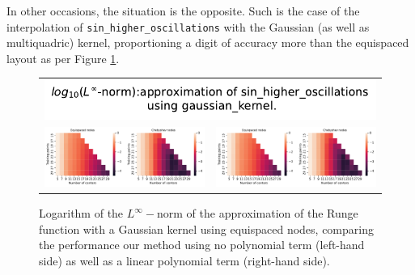 \documentclass[12pt]{report} %
\begin{document}
In other occasions, the situation is the opposite. Such is the case of the interpolation of
\texttt{sin\_higher\_oscillations} with the Gaussian (as well as multiquadric) kernel,
proportioning a digit of accuracy more than the equispaced layout as per
Figure \ref{fig:sin-higher-oscillations-gaussian-kernel-comparison-points-classic}.

\begin{figure}[h]
  \begin{tabular}{cc}
    \multicolumn{2}{c}{{\includegraphics[width=.5\textwidth]
    {imagenes/experiments/1d/variational/linf_sin_higher_oscillations_gaussian_kernel_Points_Classic_Title.pdf}}}                                                                                       \\
    {\includegraphics[height=.4\textwidth, trim={0 0 11.5cm 0},clip=true]
    {imagenes/experiments/1d/variational/linf_sin_higher_oscillations_gaussian_kernel_Points_Classic_Comparison.pdf}}  &
     {\includegraphics[height=.4\textwidth, trim={9.5cm 0 0 0},clip=true]{imagenes/experiments/1d/variational/linf_sin_higher_oscillations_gaussian_kernel_Points_Classic_Comparison.pdf}} \\
  \end{tabular}
  \caption{Logarithm of the $L^\infty-$norm of the approximation of the Runge function with a Gaussian kernel using equispaced nodes, comparing the performance our method using no polynomial term (left-hand side) as well as a linear polynomial term (right-hand side).}
  \label{fig:sin-higher-oscillations-gaussian-kernel-comparison-points-classic}
\end{figure}
\end{document}
